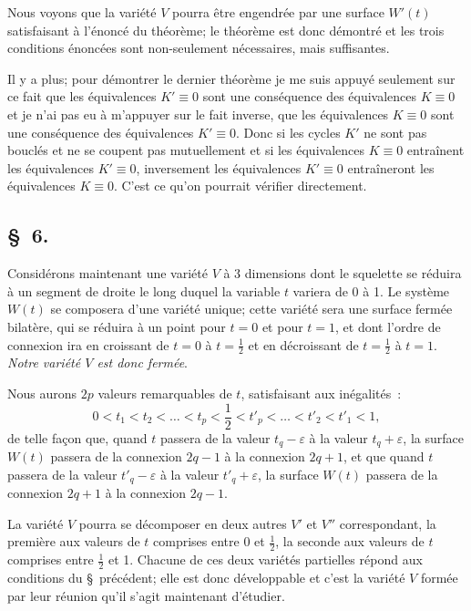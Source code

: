 \documentclass{article}
\begin{document}
Nous voyons que la variété $V$ pourra être engendrée par une surface $W'(t)$ satisfaisant à l'énoncé du théorème; le théorème est donc démontré et les trois conditions énoncées sont non-seulement nécessaires, mais suffisantes.

Il y a plus; pour démontrer le dernier théorème je me suis appuyé seulement sur ce fait que les équivalences $K' \equiv 0$ sont une conséquence des équivalences $K \equiv 0$ et je n'ai pas eu à m'appuyer sur le fait inverse, que les équivalences $K \equiv 0$ sont une conséquence des équivalences $K' \equiv 0$. Donc si les cycles $K'$ ne sont pas bouclés et ne se coupent pas mutuellement et si les équivalences $K \equiv 0$ entraînent les équivalences $K' \equiv 0$, inversement les équivalences $K' \equiv 0$ entraîneront les équivalences $K \equiv 0$. C'est ce qu'on pourrait vérifier directement.


\subsection*{\S~6.}

Considérons maintenant une variété $V$ à 3 dimensions dont le squelette se réduira à un segment de droite le long duquel la variable $t$ variera de 0 à 1. Le système $W(t)$ se composera d'une variété unique; cette variété sera une surface fermée bilatère, qui se réduira à un point pour $t = 0$ et pour $t = 1$, et dont l'ordre de connexion ira en croissant de $t = 0$ à $t = \frac{1}{2}$ et en décroissant de $t = \frac{1}{2}$ à $t = 1$. \emph{Notre variété $V$ est donc fermée}.

Nous aurons $2p$ valeurs remarquables de $t$, satisfaisant aux inégalités~:
\[ 0 < t_{1} < t_{2} < \ldots < t_{p} < \frac{1}{2} < t'_{p} < \ldots < t'_{2} < t'_{1} < 1, \]
de telle façon que, quand $t$ passera de la valeur $t_{q} - \varepsilon$ à la valeur $t_{q} + \varepsilon$, la surface $W(t)$ passera de la connexion $2q - 1$ à la connexion $2q + 1$, et que quand $t$ passera de la valeur $t'_{q} - \varepsilon$ à la valeur $t'_{q} + \varepsilon$, la surface $W(t)$ passera de la connexion $2q + 1$ à la connexion $2q - 1$.

La variété $V$ pourra se décomposer en deux autres $V'$ et $V''$ correspondant, la première aux valeurs de $t$ comprises entre 0 et $\frac{1}{2}$, la seconde aux valeurs de $t$ comprises entre $\frac{1}{2}$ et 1. Chacune de ces deux variétés partielles répond aux conditions du \S\ précédent; elle est donc développable et c'est la variété $V$ formée par leur réunion qu'il s'agit maintenant d'étudier.
\end{document}
